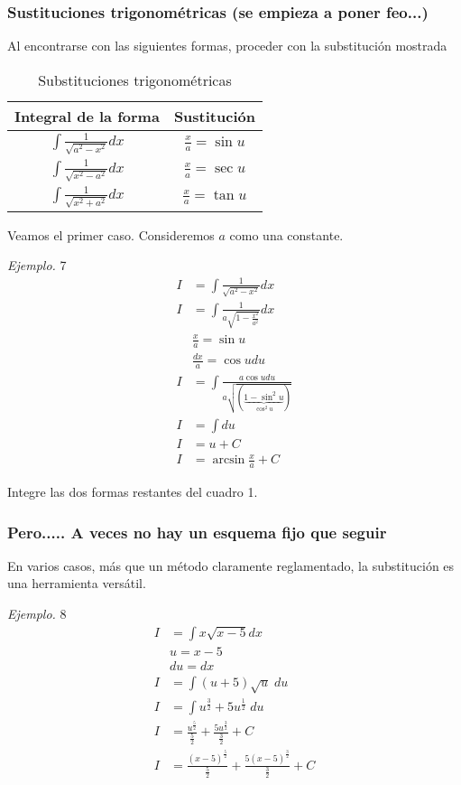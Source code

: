 \documentclass[spanish,12pt]{article}
\begin{document}
\subsubsection{Sustituciones trigonométricas (se empieza a poner feo...)}
Al encontrarse con las siguientes formas, proceder con la substitución mostrada
\begin{table}[h!]
    \centering
    \begin{tabular}{|cc|}
     \toprule
         Integral de la forma & Sustitución  \\
    \midrule    
        $\int\frac{1}{\sqrt{a^2-x^2}}dx$ &  $\frac{x}{a}=\sin{u}$\\
        $\int\frac{1}{\sqrt{x^2-a^2}}dx$& $\frac{x}{a}=\sec{u}$\\
        $\int\frac{1}{\sqrt{x^2+a^2}}dx$&$\frac{x}{a}=\tan{u}$\\
    \bottomrule
    \end{tabular}
    \caption{Substituciones trigonométricas}
    \label{tab:my_label}
\end{table}
Veamos el primer caso. Consideremos $a$ como una constante.

\textit{Ejemplo.} 7
\begin{align*}
    I&=\int\frac{1}{\sqrt{a^2-x^2}}dx\\
    I&=\int\frac{1}{a\sqrt{1-\frac{x^2}{a^2}}}dx\\
    &\frac{x}{a}=\sin{u}\\
    &\frac{dx}{a}=\cos{u}du\\
    I&=\int\frac{a\cos{u}du}{a\sqrt{(\underbrace{1-\sin^2{u}}_{\cos^2{u}})}}\\
    I&=\int du\\
    I&=u+C\\
    I&=\arcsin{\frac{x}{a}}+C
\end{align*}

Integre las dos formas restantes del cuadro 1.

\subsubsection{Pero..... A veces no hay un esquema fijo que seguir}
En varios casos, más que un método claramente reglamentado, la substitución es una herramienta versátil.

\textit{Ejemplo.} 8
\begin{align*}
    I&=\int x\sqrt{x-5}dx\\
    &u=x-5\\
    &du=dx\\
    I&=\int (u+5)\sqrt{u}\;du\\
    I&=\int u^\frac{3}{2}+5u^\frac{1}{2}\;du\\
    I&=\frac{u^\frac{5}{2}}{\frac{5}{2}}+\frac{5u^\frac{3}{2}}{\frac{3}{2}}+C\\
    I&=\frac{(x-5)^\frac{5}{2}}{\frac{5}{2}}+\frac{5(x-5)^\frac{3}{2}}{\frac{3}{2}}+C\\
\end{align*}
\end{document}

